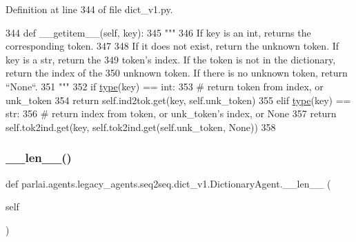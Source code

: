 Definition at line 344 of file dict\+\_\+v1.\+py.


\begin{DoxyCode}
344     \textcolor{keyword}{def }\_\_getitem\_\_(self, key):
345         \textcolor{stringliteral}{"""}
346 \textcolor{stringliteral}{        If key is an int, returns the corresponding token.}
347 \textcolor{stringliteral}{}
348 \textcolor{stringliteral}{        If it does not exist, return the unknown token. If key is a str, return the}
349 \textcolor{stringliteral}{        token's index. If the token is not in the dictionary, return the index of the}
350 \textcolor{stringliteral}{        unknown token. If there is no unknown token, return ``None``.}
351 \textcolor{stringliteral}{        """}
352         \textcolor{keywordflow}{if} \hyperlink{namespaceparlai_1_1agents_1_1tfidf__retriever_1_1build__tfidf_ad5dfae268e23f506da084a9efb72f619}{type}(key) == int:
353             \textcolor{comment}{# return token from index, or unk\_token}
354             \textcolor{keywordflow}{return} self.ind2tok.get(key, self.unk\_token)
355         \textcolor{keywordflow}{elif} \hyperlink{namespaceparlai_1_1agents_1_1tfidf__retriever_1_1build__tfidf_ad5dfae268e23f506da084a9efb72f619}{type}(key) == str:
356             \textcolor{comment}{# return index from token, or unk\_token's index, or None}
357             \textcolor{keywordflow}{return} self.tok2ind.get(key, self.tok2ind.get(self.unk\_token, \textcolor{keywordtype}{None}))
358 
\end{DoxyCode}
\mbox{\label{classparlai_1_1agents_1_1legacy__agents_1_1seq2seq_1_1dict__v1_1_1DictionaryAgent_ad7ee199272d3dfdf934858d66270f806}} 
\subsubsection{\texorpdfstring{\+\_\+\+\_\+len\+\_\+\+\_\+()}{\_\_len\_\_()}}
{\footnotesize\ttfamily def parlai.\+agents.\+legacy\+\_\+agents.\+seq2seq.\+dict\+\_\+v1.\+Dictionary\+Agent.\+\_\+\+\_\+len\+\_\+\+\_\+ (\begin{DoxyParamCaption}\item[{}]{self }\end{DoxyParamCaption})}



